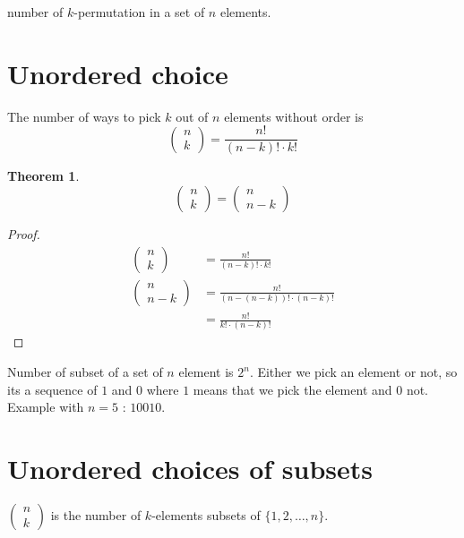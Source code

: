 \documentclass[a4paper,11pt]{report}
\newtheorem{theorem}{Theorem}
\begin{document}
number of $k$-permutation in a set of $n$ elements.

\section{Unordered choice}

The number of ways to pick $k$ out of $n$ elements without order is
\[
  \begin{pmatrix} n \\ k\end{pmatrix} = \frac{n!}{(n-k)! \cdot k!}
\]

\begin{theorem}
  \[
    \begin{pmatrix} n \\ k\end{pmatrix} = \begin{pmatrix} n \\ n-k\end{pmatrix}
  \]
\end{theorem}

\begin{proof}
  \begin{align*}
    \begin{pmatrix} n \\ k\end{pmatrix}   &= \frac{n!}{(n-k)! \cdot k!} \\
    \begin{pmatrix} n \\ n-k\end{pmatrix} &= \frac{n!}{(n-(n-k))! \cdot (n-k)!} \\
                                          &= \frac{n!}{k! \cdot (n-k)!}
  \end{align*}
\end{proof}

Number of subset of a set of $n$ element is $ 2^n $. Either we pick an element
or not, so its a sequence of $1$ and $0$ where $1$ means that we pick the
element and $0$ not. Example with $n=5$ : $10010$.

\section{Unordered choices of subsets}

$\begin{pmatrix} n \\ k\end{pmatrix}$ is the number of $k$-elements subsets of
$\{1,2,\dots,n\}$.
\end{document}
